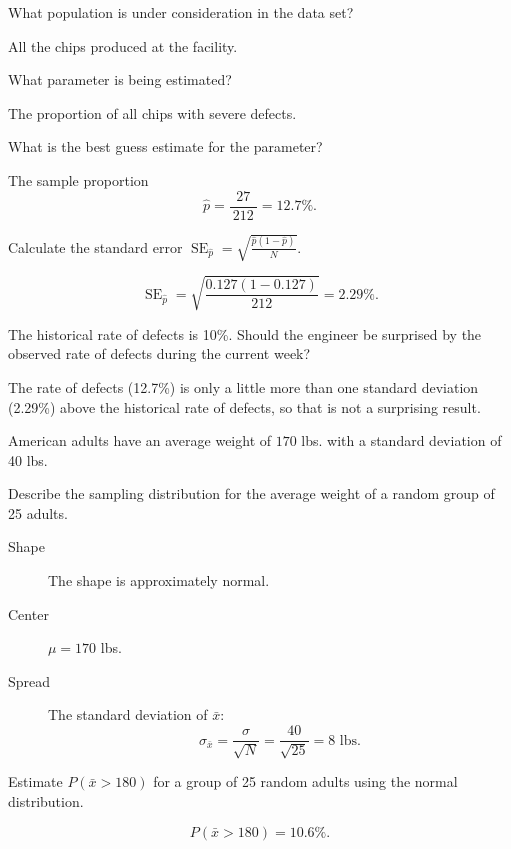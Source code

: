 \documentclass[12pt]{exam}
\newcounter{countA}
\begin{document}
\begin{questions}
  \begin{parts}
  \item
    What population is under consideration in the data set?
\begin{solution}
All the chips produced at the facility.
\end{solution}
\vfill
  \item
    What parameter is being estimated?
\begin{solution}
The proportion of all chips with severe defects. 
\end{solution}
\vfill
  \item
    What is the best guess estimate for the parameter?
\begin{solution}
The sample proportion
$$\hat{p} = \frac{ 27 }{~ 212 ~} = 12.7\%.$$
\end{solution}
\vfill
  \item
    Calculate the standard error $\displaystyle \operatorname{SE}_{\hat{p}} = \sqrt{\frac{\hat{p}(1-\hat{p})}{N}}.$
\begin{solution}
$$\operatorname{SE}_{\hat{p}} = \sqrt{\frac{ 0.127 (1-0.127) }{ 212 }} = 2.29\%.$$
\end{solution}
\vfill
  \item
    The historical rate of defects is 10\%. Should the engineer be
    surprised by the observed rate of defects during the current week?
\begin{solution}
The rate of defects (12.7\%) is only a little more than one standard deviation (2.29\%) above the historical rate of defects, so that is not a surprising result. 
\end{solution}
\vfill
  \end{parts}
\item
  American adults have an average weight of \(170\) lbs. with a standard
  deviation of 40 lbs.

  \begin{parts}
  \item
    Describe the sampling distribution for the average weight of a
    random group of 25 adults.
\begin{solution}
\begin{description}
\item[Shape] The shape is approximately normal.
\item[Center] $\mu = 170$ lbs.
\item[Spread] The standard deviation of $\bar{x}$:
$$\sigma_{\bar{x}} = \frac{\sigma}{\sqrt{N}} = \frac{40}{\sqrt{25}} = 8 \text{ lbs}.$$
\end{description}
\end{solution}
\vfill
  \item
    Estimate \(P(\bar{x} > 180)\) for a group of 25 random adults using the normal distribution.
\begin{solution}
$$P(\bar{x} > 180) = 10.6\%.$$
\end{solution}
\vfill
  \end{parts}

\setcounter{countA}{\value{question}}
\end{questions}
\end{document}
